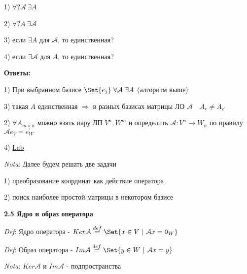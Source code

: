\documentclass[12pt]{article}
\begin{document}
    1) $\forall ? \mathcal{A} \ \exists A$

    2) $\forall ? A \ \exists \mathcal{A}$

    3) если $\exists A$ для $\mathcal{A}$, то единственная?

    4) если $\exists \mathcal{A}$ для $A$, то единственная?

    \vspace{5mm}
    \textbf{
    Ответы:}

    1) При выбранном базисе $\Set{e_j} \ \forall \mathcal{A} \ \exists A$ (алгоритм выше)

    3) такая $A$ единственная $\Longrightarrow$ в разных базисах матрицы ЛО $\mathcal{A} \quad A_e \neq A_{e^\prime}$

    2) $\forall A_{m\times n}$ можно взять пару ЛП $V^n, W^m$ и определить $\mathcal{A} : V^n \rightarrow W_n$ по правилу $\mathcal{A}e_V = e_W^\prime$

    4) \underline{Lab}

    \vspace{3mm}
\textit{Nota}: Далее будем решать две задачи

    1) преобразование координат как действие оператора

    2) поиск наиболее простой матрицы в некотором базисе

    \vspace{10mm}

    \textbf{2.5 Ядро и образ оператора}

    \vspace{3mm}
\textit{Def}: Ядро оператора - $Ker \mathcal{A} \stackrel{def}{=} \Set{x \in V \ | \ \mathcal{A}x = \texttt{0}_W}$

    \vspace{3mm}
\textit{Def}: Образ оператора - $Im \mathcal{A} \stackrel{def}{=} \Set{y \in W \ | \ \mathcal{A}x = y}$

    \vspace{3mm}
\textit{Nota}: $Ker \mathcal{A}$ и $Im \mathcal{A}$ - подпространства
\end{document}
